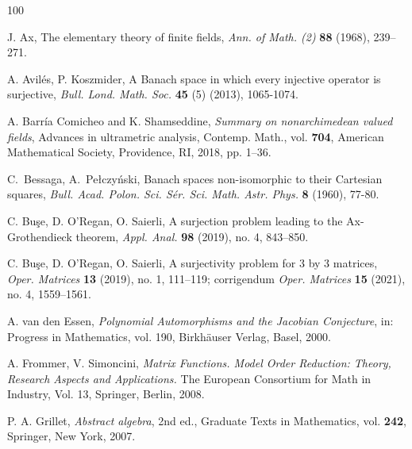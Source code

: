 \documentclass{amsart}
\theoremstyle{definition}
\begin{document}
	\begin{thebibliography}{100}
		
		
		
			J. Ax, The elementary theory of finite fields, \textit{Ann. of Math. (2)}   \textbf{88} (1968), 239–271.
		
		 A. Avilés, P. Koszmider, A Banach space in which every injective operator is surjective, \textit{Bull. Lond. Math. Soc.} \textbf{45} (5) (2013), 1065-1074. 
		
		
		
		
		 A. Barría Comicheo and K. Shamseddine, \textit{Summary on nonarchimedean valued fields}, Advances in ultrametric analysis, Contemp. Math., vol. \textbf{704}, American Mathematical Society, Providence, RI, 2018, pp. 1–36. 
		
		
		C.\ Bessaga,  A.\ Pe\l czy\' nski, 
		Banach spaces non-isomorphic to their Cartesian squares, \textit{Bull. Acad. Polon. Sci. S\' er. Sci. Math. Astr. Phys.} \textbf{8} (1960), 77-80.
		
		 C. Buşe, D. O'Regan,  O. Saierli, A surjection problem leading to the Ax-Grothendieck theorem, \textit{Appl. Anal.} \textbf{98} (2019), no. 4, 843–850.
		
		 C. Buşe, D. O'Regan,  O. Saierli, A surjectivity problem for 3 by 3 matrices, \textit{Oper. Matrices} \textbf{13} (2019), no. 1, 111–119; corrigendum \textit{Oper. Matrices} \textbf{15} (2021), no. 4, 1559–1561.
		
		
		
		
		
		
		
		 A. van den Essen, \textit{Polynomial Automorphisms and the Jacobian Conjecture}, in: Progress in Mathematics, vol. 190, Birkhäuser Verlag, Basel, 2000. 
		
		
		 A. Frommer, V. Simoncini, \textit{Matrix Functions. Model Order Reduction: Theory, Research Aspects and Applications.} The European Consortium for Math in Industry, Vol. 13, Springer, Berlin, 2008.
		
		
		 P. A. Grillet, \textit{Abstract algebra}, 2nd ed., Graduate Texts in Mathematics, vol. \textbf{242}, Springer, New York, 2007.
		

\end{thebibliography}
\end{document}
